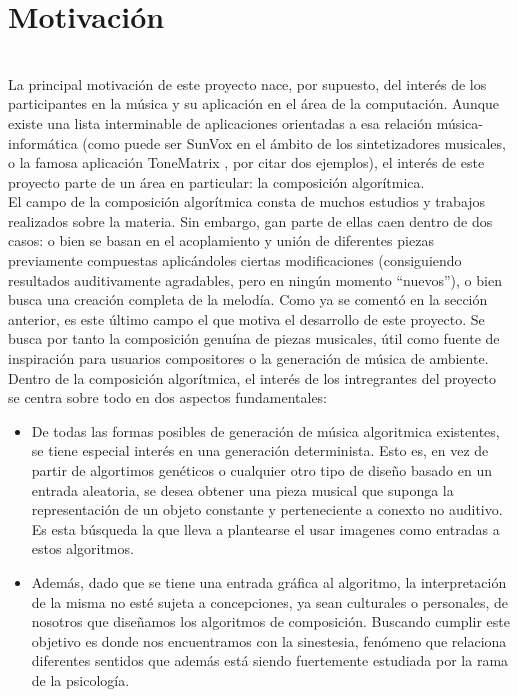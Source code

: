 \section{Motivación}
\label{sec:motivacion}

\\

La principal motivación de este proyecto nace, por supuesto, del interés de los participantes en la música y su aplicación en el área de la computación. Aunque existe una lista interminable de aplicaciones orientadas a esa relación música-informática (como puede ser SunVox \cite{SunVox} en el ámbito de los sintetizadores musicales, o la famosa aplicación ToneMatrix \cite{toneMatrix}, por citar dos ejemplos), el interés de este proyecto parte de un área en particular: la composición algorítmica.\\

El campo de la composición algorítmica consta de muchos estudios y trabajos realizados sobre la materia. Sin embargo, gan parte de ellas caen dentro de dos casos: o bien se basan en el acoplamiento y unión de diferentes piezas previamente compuestas aplicándoles ciertas modificaciones (consiguiendo resultados auditivamente agradables, pero en ningún momento ``nuevos''), o bien busca una creación completa de la melodía. Como ya se comentó en la sección anterior, es este último campo el que motiva el desarrollo de este proyecto. Se busca por tanto la composición genuína de piezas musicales, útil como fuente de inspiración para usuarios compositores o la generación de música de ambiente.\\

Dentro de la composición algorítmica, el interés de los intregrantes del proyecto se centra sobre todo en dos aspectos fundamentales:

\begin{itemize}

	\item De todas las formas posibles de generación de música algoritmica existentes, se tiene especial interés en una generación determinista. Esto es, en vez de partir de algortimos genéticos o cualquier otro tipo de diseño basado en un entrada aleatoria, se desea obtener una pieza musical que suponga la representación de un objeto constante y perteneciente a conexto no auditivo. Es esta búsqueda la que lleva a plantearse el usar imagenes como entradas a estos algoritmos.
	
	\item Además, dado que se tiene una entrada gráfica al algoritmo, la interpretación de la misma no esté sujeta a concepciones, ya sean culturales o personales, de nosotros que diseñamos los algoritmos de composición. Buscando cumplir este objetivo es donde nos encuentramos con la sinestesia, fenómeno que relaciona diferentes sentidos que además está siendo fuertemente estudiada por la rama de la psicología.
	
\end{itemize}

